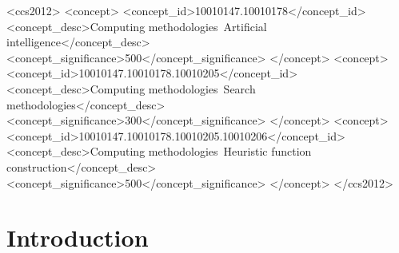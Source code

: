 \documentclass[sigconf]{acmart}
\begin{document}
 \begin{CCSXML}
<ccs2012>
<concept>
<concept_id>10010147.10010178</concept_id>
<concept_desc>Computing methodologies~Artificial intelligence</concept_desc>
<concept_significance>500</concept_significance>
</concept>
<concept>
<concept_id>10010147.10010178.10010205</concept_id>
<concept_desc>Computing methodologies~Search methodologies</concept_desc>
<concept_significance>300</concept_significance>
</concept>
<concept>
<concept_id>10010147.10010178.10010205.10010206</concept_id>
<concept_desc>Computing methodologies~Heuristic function 
construction</concept_desc>
<concept_significance>500</concept_significance>
</concept>
</ccs2012>
\end{CCSXML}




\maketitle

%
%
\section{Introduction}
\label{sec:intro}
\end{document}
